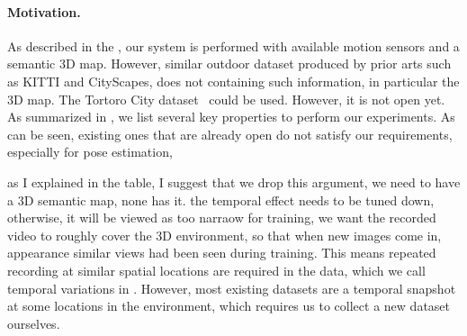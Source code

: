 \paragraph{Motivation.}
As described in the , our system is performed with available motion sensors and a semantic 3D map.
However, similar outdoor dataset produced by prior arts such as KITTI and CityScapes, does not containing such information, in particular the 3D map. The Tortoro City dataset~\cite{wang2016torontocity} could be used. However, it is not open yet. As summarized in , we list several key properties to perform our experiments.
As can be seen, existing ones that are already open do not satisfy our requirements, especially for pose estimation, 

\textcolor[rgb]{1.00,0.00,0.00}{as I explained in the table, I suggest that we drop this argument, we need to have a 3D semantic map, none has it. the temporal effect needs to be tuned down, otherwise, it will be viewed as too narraow}
for training, we want the recorded video to roughly cover the 3D environment, so that when new images come in, appearance similar views had been seen during training. This means repeated recording at similar spatial locations are required in the data, which we call temporal variations in .
However, most existing datasets are a temporal snapshot at some locations in the environment, which requires us to collect a new dataset ourselves.


